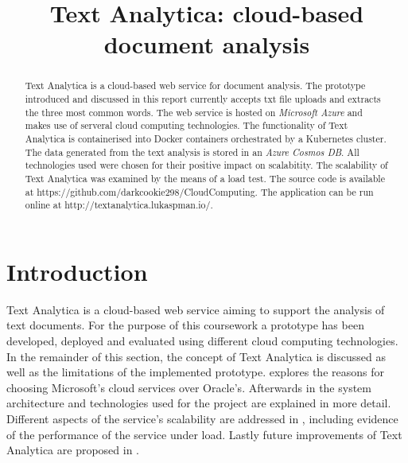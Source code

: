 \documentclass[conference]{IEEEtran}
\begin{document}
\title{Text Analytica: cloud-based document analysis\\}

\author{
\and
{}
}

\maketitle

\begin{abstract}
Text Analytica is a cloud-based web service for document analysis. The prototype introduced and discussed in this report currently accepts txt file uploads and extracts the three most common words. The web service is hosted on \textit{Microsoft Azure} and makes use of serveral cloud computing technologies. The functionality of Text Analytica is containerised into Docker containers orchestrated by a Kubernetes cluster. The data generated from the text analysis is stored in an \textit{Azure Cosmos DB}. All technologies used were chosen for their positive impact on scalabitity. The scalability of Text Analytica was examined by the means of a load test. The source code is available at https://github.com/darkcookie298/CloudComputing. The application can be run online at http://textanalytica.lukaspman.io/.
\end{abstract}

\section{Introduction}
\label{sec:intro}
Text Analytica is a cloud-based web service aiming to support the analysis of text documents. For the purpose of this coursework a prototype has been developed, deployed and evaluated using different cloud computing technologies. In the remainder of this section, the concept of Text Analytica is discussed as well as the limitations of the implemented prototype.  explores the reasons for choosing Microsoft’s cloud services over Oracle’s. Afterwards in  the system architecture and technologies used for the project are explained in more detail. Different aspects of the service’s scalability are addressed in , including evidence of the performance of the service under load. Lastly future improvements of Text Analytica are proposed in .
\end{document}
